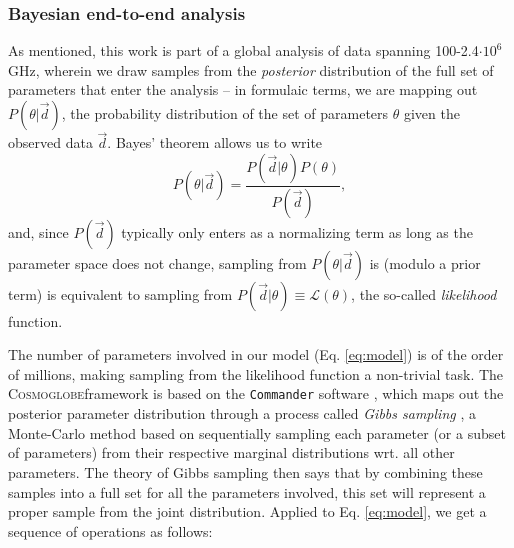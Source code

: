 \documentclass{aa}
\newcommand{\dv}[0]{\vec{d}}
\def\Cosmoglobe{\textsc{Cosmoglobe}}
\def\Commander{\texttt{Commander} }
\begin{document}
\subsubsection{Bayesian end-to-end analysis}
As mentioned, this work is part of a global analysis of data spanning
100-2.4$\cdot 10^6$ GHz, wherein we draw samples from the \emph{posterior}
distribution of the full set of parameters that enter the analysis
\citep{CG02_01} -- in formulaic terms, we are mapping out $P(\theta | \dv)$,
the probability distribution of the set of parameters $\theta$ given the
observed data $\dv$. Bayes' theorem allows us to write
\begin{equation}
    \label{eq:bayestheorem}
    P(\theta|\dv) = \frac{P(\dv|\theta)P(\theta)}{P(\dv)},
\end{equation}
and, since $P(\dv)$ typically only enters as a normalizing term as long as the
parameter space does not change, sampling from $P(\theta|\dv)$ is (modulo a
prior term) is equivalent to sampling from
$P(\dv|\theta)\equiv\mathcal{L}(\theta)$, the so-called \emph{likelihood}
function.

The number of parameters involved in our model (Eq. \ref{eq:model}) is of the
order of millions, making sampling from the likelihood function a non-trivial
task. The \Cosmoglobe framework is based on the \Commander software
\citep{eriksen:2004,seljebotn:2019,bp03}, which maps out the posterior
parameter distribution through a process called \emph{Gibbs sampling}
\citep[e.g.,][]{geman:1984}, a Monte-Carlo method based on sequentially
sampling each parameter (or a subset of parameters) from their respective
marginal distributions wrt. all other parameters. The theory of Gibbs sampling
then says that by combining these samples into a full set for all the
parameters involved, this set will represent a proper sample from the joint
distribution. Applied to Eq. \ref{eq:model}, we get a sequence of operations as
follows:
\end{document}
